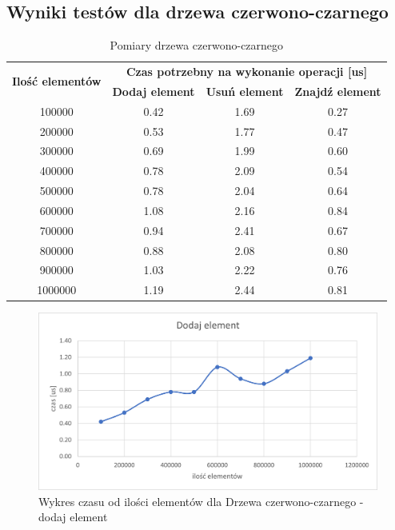\documentclass{article}
\begin{document}
    \subsection{Wyniki testów dla drzewa czerwono-czarnego}
    \begin{table}[H]
        \centering
        \begin{tabular}{|c|ccc|}
            \hline
            \multirow{2}{*}{\textbf{Ilość   elementów}} & \multicolumn{3}{c|}{\textbf{Czas   potrzebny na wykonanie operacji {[}us{]}}} \\ \cline{2-4} 
             & \multicolumn{1}{c|}{\textbf{Dodaj element}} & \multicolumn{1}{c|}{\textbf{Usuń element}} & \textbf{Znajdź element} \\ \hline
            100000 & \multicolumn{1}{c|}{0.42} & \multicolumn{1}{c|}{1.69} & 0.27 \\ \hline
            200000 & \multicolumn{1}{c|}{0.53} & \multicolumn{1}{c|}{1.77} & 0.47 \\ \hline
            300000 & \multicolumn{1}{c|}{0.69} & \multicolumn{1}{c|}{1.99} & 0.60 \\ \hline
            400000 & \multicolumn{1}{c|}{0.78} & \multicolumn{1}{c|}{2.09} & 0.54 \\ \hline
            500000 & \multicolumn{1}{c|}{0.78} & \multicolumn{1}{c|}{2.04} & 0.64 \\ \hline
            600000 & \multicolumn{1}{c|}{1.08} & \multicolumn{1}{c|}{2.16} & 0.84 \\ \hline
            700000 & \multicolumn{1}{c|}{0.94} & \multicolumn{1}{c|}{2.41} & 0.67 \\ \hline
            800000 & \multicolumn{1}{c|}{0.88} & \multicolumn{1}{c|}{2.08} & 0.80 \\ \hline
            900000 & \multicolumn{1}{c|}{1.03} & \multicolumn{1}{c|}{2.22} & 0.76 \\ \hline
            1000000 & \multicolumn{1}{c|}{1.19} & \multicolumn{1}{c|}{2.44} & 0.81 \\ \hline
        \end{tabular}
        \caption{Pomiary drzewa czerwono-czarnego}
    \end{table}

    
    \begin{figure}[H]
        \centering
        \includegraphics[scale = 0.85]{wykresy/rbt/add.png}
        \caption{Wykres czasu od ilości elementów dla Drzewa czerwono-czarnego - dodaj element}
    \end{figure}
    
\end{document}
